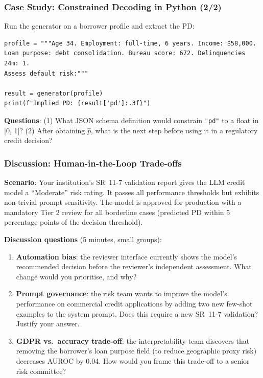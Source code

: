 \documentclass[9pt,t]{beamer}
\begin{document}
\begin{frame}[fragile]
\frametitle{Case Study: Constrained Decoding in Python (2/2)}

Run the generator on a borrower profile and extract the PD:

\begin{lstlisting}
profile = """Age 34. Employment: full-time, 6 years. Income: $58,000.
Loan purpose: debt consolidation. Bureau score: 672. Delinquencies 24m: 1.
Assess default risk:"""

result = generator(profile)
print(f"Implied PD: {result['pd']:.3f}")
\end{lstlisting}

\medskip
\textbf{Questions}: (1) What JSON schema definition would constrain \texttt{"pd"} to a float in [0, 1]?
(2) After obtaining $\hat{p}$, what is the next step before using it in a regulatory credit decision?
\end{frame}

\begin{frame}
\frametitle{Discussion: Human-in-the-Loop Trade-offs}

\textbf{Scenario}: Your institution's SR~11-7 validation report gives the LLM credit model a
``Moderate'' risk rating. It passes all performance thresholds but exhibits non-trivial prompt sensitivity.
The model is approved for production with a mandatory Tier 2 review for all borderline cases
(predicted PD within 5 percentage points of the decision threshold).

\medskip
\textbf{Discussion questions} (5 minutes, small groups):

\begin{enumerate}
  \item \textbf{Automation bias}: the reviewer interface currently shows the model's recommended decision before the reviewer's independent assessment. What change would you prioritise, and why?

  \item \textbf{Prompt governance}: the risk team wants to improve the model's performance on
  commercial credit applications by adding two new few-shot examples to the system prompt.
  Does this require a new SR~11-7 validation? Justify your answer.

  \item \textbf{GDPR vs.\ accuracy trade-off}: the interpretability team discovers that removing
  the borrower's loan purpose field (to reduce geographic proxy risk) decreases AUROC by 0.04.
  How would you frame this trade-off to a senior risk committee?
\end{enumerate}
\end{frame}
\end{document}
